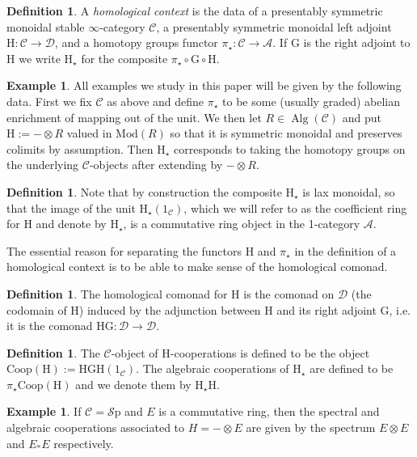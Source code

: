 \documentclass[10pt]{amsart}
\theoremstyle{definition}
\numberwithin{figure}{section}
\numberwithin{equation}{section}
\newtheorem{definition}[figure]{Definition}
\newtheorem{example}[figure]{Example}
\newcommand{\cA}{\mathcal{A}}
\newcommand{\cC}{\mathcal{C}}
\newcommand{\cD}{\mathcal{D}}
\newcommand{\one}{\mathrm{1}}
\theoremstyle{cited}
\newcommand{\Alg}{\operatorname{Alg}}
\newcommand{\Sp}{{\mathcal{S}\mathrm{p}}}
\newcommand{\Mod}{\mathrm{Mod}}
\renewcommand{\H}{\mathrm{H}}
\newcommand{\G}{\mathrm{G}}
\newcommand{\Coop}{\mathrm{Coop}}
\begin{document}
\begin{definition}
  \label{def:homcontext}
  A \textit{homological context} is the data of a presentably symmetric monoidal  stable $\infty$-category $\cC$, a presentably symmetric monoidal left adjoint $\H:\cC\to \cD$, and a homotopy groups functor $\pi_\star:\cC\to \cA$. If $\G$ is the right adjoint to $\H$ we write $\H_\star$ for the composite $\pi_\star\circ \G\circ \H$.
\end{definition}

\begin{example}
  All examples we study in this paper will be given by the following data. First we fix $\cC$ as above and define $\pi_\star$ to be some (usually graded) abelian enrichment of mapping out of the unit. We then let $R\in \Alg(\cC)$ and put $\H:=-\otimes R$ valued in $\Mod(R)$ so that it is symmetric monoidal and preserves colimits by assumption. Then $\H_\star$ corresponds to taking the homotopy groups on the underlying $\cC$-objects after extending by $-\otimes R$.
\end{example}

\begin{definition}
  Note that by construction the composite $\H_\star$ is lax monoidal, so that the image of the unit $\H_\star(\one_{\cC})$, which we will refer to as the coefficient ring for $\H$ and denote by $\H_\star$, is a commutative ring object in the 1-category $\cA$.
\end{definition}

The essential reason for separating the functors $\H$ and $\pi_\star$ in the definition of a homological context is to be able to make sense of the homological comonad.

\begin{definition}
  The homological comonad for $\H$ is the comonad on $\cD$ (the codomain of $\H$) induced by the adjunction between $\H$ and its right adjoint $\G$, i.e. it is the comonad $\H\G: \cD\to \cD$. 
\end{definition}

\begin{definition}
  The $\cC$-object of $\H$-cooperations is defined to be the object $\Coop(\H):=\H\G\H(\one_{\cC})$. The algebraic cooperations of $\H_\star$ are defined to be $\pi_\star\Coop(\H)$ and we denote them by $\H_\star \H$.
\end{definition}

\begin{example}
  If $\cC=\Sp$ and $E$ is a commutative ring, then the spectral and algebraic cooperations associated to $H=-\otimes E$ are given by the spectrum $E\otimes E$ and $E_*E$ respectively.
\end{example}
\end{document}
